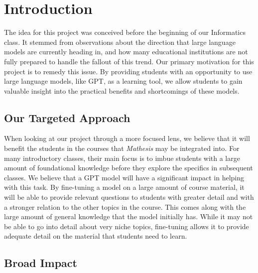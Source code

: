 \documentclass[12pt,a4paper]{article}
\begin{document}
    \pagebreak
    \section{Introduction}

    The idea for this project was conceived before the beginning of our Informatics class.
    It stemmed from observations about the direction that large language models are currently
    heading in, and how many educational institutions are not fully prepared to handle the
    fallout of this trend.  Our primary motivation for this project is to remedy this issue.  By
    providing students with an opportunity to use large language models, like GPT, as a learning tool,
    we allow students to gain valuable insight into the practical benefits and shortcomings of these models.

    \subsection{Our Targeted Approach}

    When looking at our project through a more focused lens, we believe that it will benefit the
    students in the courses that \textit{Mathesis} may be integrated into.  For many introductory
    classes, their main focus is to imbue students with a large amount of foundational
    knowledge before they explore the specifics in subsequent classes.  We believe that
    a GPT model will have a significant impact in helping with this task.  By fine-tuning a model
    on a large amount of course material, it will be able to provide relevant questions to students
    with greater detail and with a stronger relation to the other topics in the course.  This comes
    along with the large amount of general knowledge that the model initially has.  While it may
    not be able to go into detail about very niche topics, fine-tuning allows it to provide adequate
    detail on the material that students need to learn.

    \subsection{Broad Impact}
\end{document}
